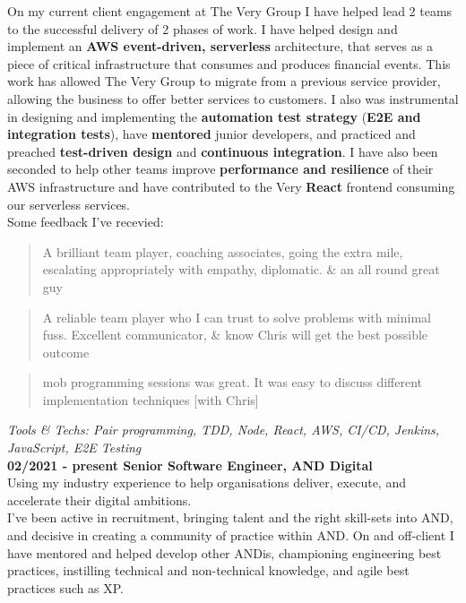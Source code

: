 On my current client engagement at The Very Group I have helped lead 2 teams to the successful delivery of 2 phases of work. I have helped design and implement an \textbf{AWS event-driven, serverless} architecture, that serves as a piece of critical infrastructure that consumes and produces financial events. This work has allowed The Very Group to migrate from a previous service provider, allowing the business to offer better services to customers. I also was instrumental in designing and implementing the \textbf{automation test strategy} (\textbf{E2E and integration tests}), have \textbf{mentored} junior developers, and practiced and preached \textbf{test-driven design} and \textbf{continuous integration}. I have also been seconded to help other teams improve \textbf{performance and resilience} of their AWS infrastructure and have contributed to the Very \textbf{React} frontend consuming our serverless services.\\

Some feedback I've recevied:\\

\begin{quote}
A brilliant team player, coaching associates, going the extra mile, escalating appropriately with empathy, diplomatic. \& an all round great guy
\end{quote}

\begin{quote}
A reliable team player who I can trust to solve problems with minimal fuss. Excellent communicator, \& know Chris will get the best possible outcome
\end{quote}

\begin{quote}
mob programming sessions was great. It was easy to discuss different implementation techniques [with Chris]
\end{quote}

\emph{Tools \& Techs: Pair programming, TDD, Node, React, AWS, CI/CD, Jenkins, JavaScript, E2E Testing}\\

\textbf{02/2021 - present \hspace{2.75em}Senior Software Engineer, AND Digital}\\

Using my industry experience to help organisations deliver, execute, and accelerate their digital ambitions.\\

I've been active in recruitment, bringing talent and the right skill-sets into AND, and decisive in creating a community of practice within AND. On and off-client I have mentored and helped develop other ANDis, championing engineering best practices, instilling technical and non-technical knowledge, and agile best practices such as XP.\\

